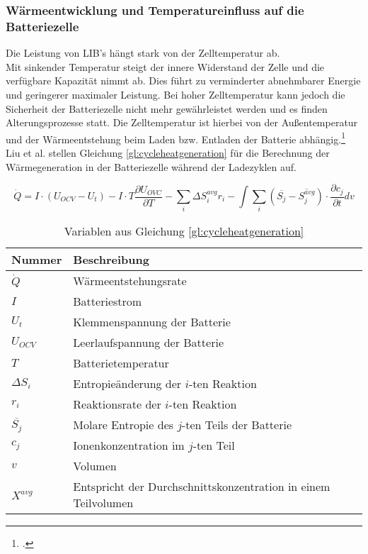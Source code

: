 \subsubsection*{Wärmeentwicklung und Temperatureinfluss auf die Batteriezelle}\label{subsub:waermeundtemperatur}

Die Leistung von LIB's hängt stark von der Zelltemperatur ab. \\
Mit sinkender Temperatur steigt der innere Widerstand der Zelle und die verfügbare Kapazität nimmt ab. Dies führt zu verminderter abnehmbarer Energie und geringerer maximaler Leistung. Bei hoher Zelltemperatur kann jedoch die Sicherheit der Batteriezelle nicht mehr gewährleistet werden und es finden Alterungsprozesse statt. Die Zelltemperatur ist hierbei von der Außentemperatur und der Wärmeentstehung beim Laden bzw. Entladen der Batterie abhängig.\footcite[Vgl.\label{cite:Liu}][S.1001-1010]{Liu2014} \\
Liu et al. stellen Gleichung \ref{gl:cycleheatgeneration} für die Berechnung der Wärmegeneration in der Batteriezelle während der Ladezyklen auf.


\begin{equation}\label{gl:cycleheatgeneration}
		\dot{Q} = I \cdot (U_{OCV} - U_{t}) 
		- I \cdot T \frac{\partial U_{OVC}}{\partial T} 
		- \sum_{i}^{ } \Delta S_{i}^{avg}r_{i}
		- \int \sum_{i}^{ } (\overline{S_{j}} - \overline{S_{j}^{avg}})	\cdot \frac{\partial c_{j}}{\partial t} dv
\end{equation}

\begin{table}[h!]
	\caption{Variablen aus Gleichung \ref{gl:cycleheatgeneration}}
	\label{tab:variablenheatgeneration}
	\vspace{0.2cm}	
	\begin{tabularx}{\textwidth}{ |X|X|  }
		\toprule[1.5pt]
		\textbf{Nummer} & \textbf{Beschreibung} \\
		\hline\hline
		$\dot{Q}$ & Wärmeentstehungsrate \\
		\hline
		$I$ & Batteriestrom\\
		\hline
		$U_{t}$ & Klemmenspannung der Batterie\\
		\hline
		$U_{OCV}$ & Leerlaufspannung der Batterie\\
		\hline
		$T$ & Batterietemperatur\\
		\hline
		$\Delta S_{i}$ & Entropieänderung der $i$-ten Reaktion \\
		\hline
		$r_{i}$ & Reaktionsrate der $i$-ten Reaktion\\
		\hline
		$\overline{S_{j}}$ & Molare Entropie des $j$-ten Teils der Batterie\\
		\hline
		$c_{j}$ & Ionenkonzentration im $j$-ten Teil\\
		\hline
		$v$ & Volumen\\
		\hline
		$X^{avg}$ & Entspricht der Durchschnittskonzentration in einem Teilvolumen\\
		\bottomrule[1.5pt]
	\end{tabularx}		
\end{table}


